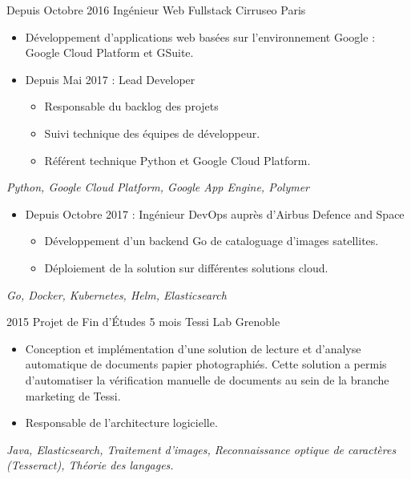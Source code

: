 \documentclass[11pt,a4paper,sans]{moderncv} %
\begin{document}
\cventry
    {Depuis Octobre 2016}
    {Ingénieur Web Fullstack}
    {}
    {Cirruseo}
    {Paris}
    {
        \begin{itemize}
            \item Développement d'applications web basées sur l'environnement Google : Google Cloud Platform et GSuite.
            \item Depuis Mai 2017 : Lead Developer
            \begin{itemize}
                \item Responsable du backlog des projets
                \item Suivi technique des équipes de développeur.
                \item Référent technique Python et Google Cloud Platform.
            \end{itemize}
        \end{itemize}
        \textit{Python, Google Cloud Platform, Google App Engine, Polymer}
        \begin{itemize}
            \item Depuis Octobre 2017 : Ingénieur DevOps auprès d'Airbus Defence and Space
                \begin{itemize}
                \item Développement d'un backend Go de cataloguage d'images satellites.
                \item Déploiement de la solution sur différentes solutions cloud.
            \end{itemize}
        \end{itemize}
        \textit{Go, Docker, Kubernetes, Helm, Elasticsearch}
    }

\cventry
    {2015}
    {Projet de Fin d'Études}
    {5 mois}
    {Tessi Lab}
    {Grenoble}
    {
        \begin{itemize}
            \item Conception et implémentation d'une solution de lecture et d'analyse automatique de documents papier photographiés. Cette solution a permis d'automatiser la vérification manuelle de documents au sein de la branche marketing de Tessi.
            \item Responsable de l'architecture logicielle.
        \end{itemize}
        \vspace*{1mm}
        \textit{Java, Elasticsearch, Traitement d'images, Reconnaissance optique de caractères (Tesseract), Théorie des langages.}
    }
\end{document}
